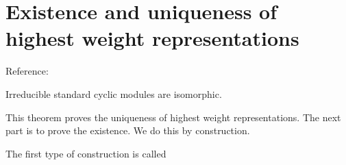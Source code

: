 \section{Existence and uniqueness of highest weight representations}
\label{sec:existence_and_uniqueness_of_highest_weight_representations}
Reference: \cite[$\S 20.3$]{humphreys1972introduction}

\begin{theorem}
    Irreducible standard cyclic modules are isomorphic.
\end{theorem}
This theorem proves the uniqueness of highest weight representations. The next part is to prove the existence. We do this by construction.

The first type of construction is called 


